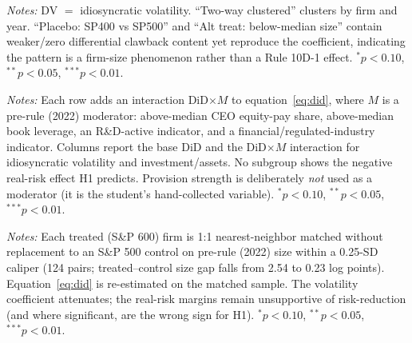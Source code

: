 \documentclass[12pt]{article}
\begin{document}
\begin{table}[htbp]\centering
\begin{threeparttable}
\caption{Robustness and placebos: the volatility result is a size$\times$COVID artifact}
\label{tab:robust}\small

\begin{tablenotes}\small\item \textit{Notes:} DV $=$ idiosyncratic volatility. ``Two-way
clustered'' clusters by firm and year. ``Placebo: SP400 vs SP500'' and ``Alt treat:
below-median size'' contain weaker/zero differential clawback content yet reproduce the
coefficient, indicating the pattern is a firm-size phenomenon rather than a Rule 10D-1 effect.
$^{*}p<0.10$, $^{**}p<0.05$, $^{***}p<0.01$.
\end{tablenotes}
\end{threeparttable}
\end{table}

\begin{table}[htbp]\centering
\begin{threeparttable}
\caption{Heterogeneity of the DiD by observable pre-rule moderators}
\label{tab:hetero}\small

\begin{tablenotes}\small\item \textit{Notes:} Each row adds an interaction
DiD$\times M$ to equation~\eqref{eq:did}, where $M$ is a pre-rule (2022) moderator: above-median
CEO equity-pay share, above-median book leverage, an R\&D-active indicator, and a
financial/regulated-industry indicator. Columns report the base DiD and the DiD$\times M$
interaction for idiosyncratic volatility and investment/assets. No subgroup shows the negative
real-risk effect H1 predicts. Provision strength is deliberately \emph{not} used as a moderator
(it is the student's hand-collected variable). $^{*}p<0.10$, $^{**}p<0.05$, $^{***}p<0.01$.
\end{tablenotes}
\end{threeparttable}
\end{table}

\begin{table}[htbp]\centering
\begin{threeparttable}
\caption{Size-matched difference-in-differences (nearest-neighbor on pre-rule size)}
\label{tab:matched}\small

\begin{tablenotes}\small\item \textit{Notes:} Each treated (S\&P 600) firm is 1:1
nearest-neighbor matched without replacement to an S\&P 500 control on pre-rule (2022) size
within a 0.25-SD caliper (124 pairs; treated--control size gap falls from 2.54 to 0.23 log
points). Equation~\eqref{eq:did} is re-estimated on the matched sample. The volatility
coefficient attenuates; the real-risk margins remain unsupportive of risk-reduction (and where
significant, are the wrong sign for H1). $^{*}p<0.10$, $^{**}p<0.05$, $^{***}p<0.01$.
\end{tablenotes}
\end{threeparttable}
\end{table}
\end{document}
